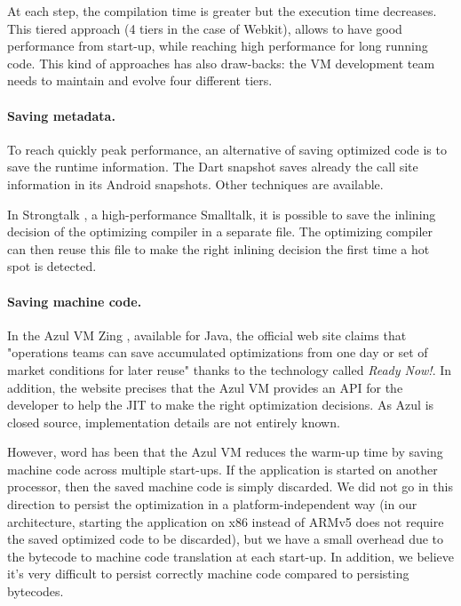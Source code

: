 \documentclass[a4paper,12pt,twoside]{../includes/ThesisStyle}
\begin{document}
At each step, the compilation time is greater but the execution time decreases. This tiered approach (4 tiers in the case of Webkit), allows to have good performance from start-up, while reaching high performance for long running code. This kind of approaches has also draw-backs: the VM development team needs to maintain and evolve four different tiers.

\paragraph{Saving metadata.}

To reach quickly peak performance, an alternative of saving optimized code is to save the runtime information. The Dart snapshot saves already the call site information in its Android snapshots. Other techniques are available.

In Strongtalk \cite{Sun06}, a high-performance Smalltalk, it is possible to save the inlining decision of the optimizing compiler in a separate file. The optimizing compiler can then reuse this file to make the right inlining decision the first time a hot spot is detected.

\paragraph{Saving machine code.}

In the Azul VM Zing \cite{Azul}, available for Java, the official web site claims that "operations teams can save accumulated optimizations from one day or set of market conditions for later reuse" thanks to the technology called \emph{Ready Now!}. In addition, the website precises that the Azul VM provides an API for the developer to help the JIT to make the right optimization decisions. As Azul is closed source, implementation details are not entirely known. 

However, word has been that the Azul VM reduces the warm-up time by saving machine code across multiple start-ups. If the application is started on another processor, then the saved machine code is simply discarded. We did not go in this direction to persist the optimization in a platform-independent way (in our architecture, starting the application on x86 instead of ARMv5 does not require the saved optimized code to be discarded), but we have a small overhead due to the bytecode to machine code translation at each start-up. In addition, we believe it's very difficult to persist correctly machine code compared to persisting bytecodes.
\end{document}
